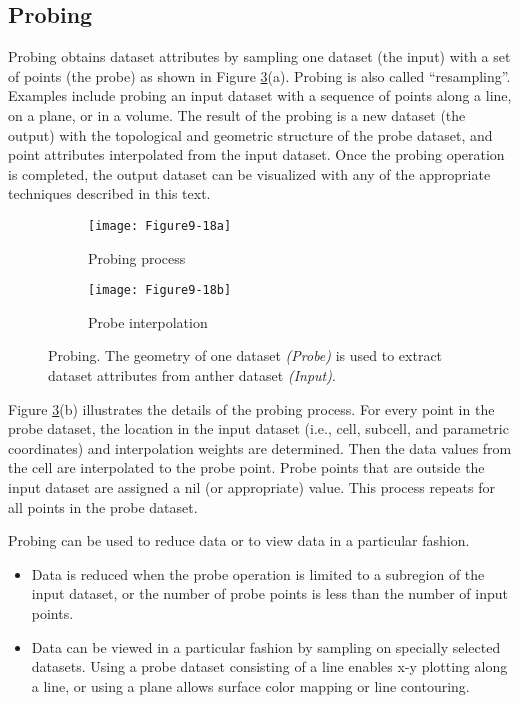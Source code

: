 \subsection{Probing}

Probing obtains dataset attributes by sampling one dataset (the input) with a set of points (the probe) as shown in Figure \ref{fig:Figure9-18}(a). Probing is also called ``resampling''. Examples include probing an input dataset with a sequence of points along a line, on a plane, or in a volume. The result of the probing is a new dataset (the output) with the topological and geometric structure of the probe dataset, and point attributes interpolated from the input dataset. Once the probing operation is completed, the output dataset can be visualized with any of the appropriate techniques described in this text.

\begin{figure}[htb]
	\begin{subfigure}[h]{0.48\linewidth}
		\texttt{[image: Figure9-18a]}
		\captionsetup{justification=centering}
		\caption{Probing process}
		\label{fig:Figure9-18a}
	\end{subfigure}
	\hfill
	\begin{subfigure}[h]{0.48\linewidth}
		\texttt{[image: Figure9-18b]}
		\captionsetup{justification=centering}
		\caption{Probe interpolation}
		\label{fig:Figure9-18b}
	\end{subfigure}
	\caption{Probing. The geometry of one dataset \textit{(Probe)} is used to extract dataset attributes from anther dataset \textit{(Input)}.}\label{fig:Figure9-18}
\end{figure}

Figure \ref{fig:Figure9-18}(b) illustrates the details of the probing process. For every point in the probe dataset, the location in the input dataset (i.e., cell, subcell, and parametric coordinates) and interpolation weights are determined. Then the data values from the cell are interpolated to the probe point. Probe points that are outside the input dataset are assigned a nil (or appropriate) value. This process repeats for all points in the probe dataset.

Probing can be used to reduce data or to view data in a particular fashion.

\begin{itemize}

\item Data is reduced when the probe operation is limited to a subregion of the input dataset, or the number of probe points is less than the number of input points.

\item Data can be viewed in a particular fashion by sampling on specially selected datasets. Using a probe dataset consisting of a line enables x-y plotting along a line, or using a plane allows surface color mapping or line contouring.

\end{itemize}

